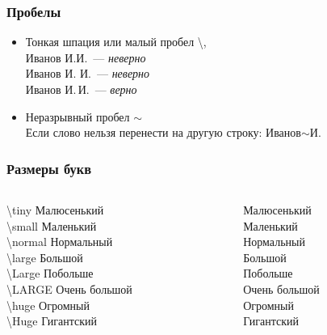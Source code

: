 \documentclass{beamer}
\begin{document}
\begin{frame}
  \frametitle{Пробелы}
  \begin{itemize}
  \item Тонкая шпация или малый пробел \textbackslash , \\
    Иванов И.И.~— {\it неверно} \\
    Иванов И. И.~— {\it неверно}\\
    Иванов И.\,И.~— {\it верно}
  \item Неразрывный пробел $\sim$\\
    Если слово нельзя перенести на другую строку: Иванов$\sim$И.
  \end{itemize}

\end{frame}

\begin{frame}
  \frametitle{Размеры букв}
  \begin{columns}
    \begin{column}{0.5\textwidth}
      \textbackslash tiny Малюсенький\\
      \textbackslash small Маленький\\
      \textbackslash normal Нормальный\\
      \textbackslash large Большой\\
      \textbackslash Large Побольше\\
      \textbackslash LARGE Очень большой\\
      \textbackslash huge Огромный\\
      \textbackslash Huge Гигантский\\
    \end{column}
    \begin{column}{0.5\textwidth}
      {\tiny Малюсенький} \\
      {\small Маленький} \\
      Нормальный \\
      {\large Большой} \\
      {\Large Побольше} \\
      {\LARGE Очень большой} \\
      {\huge Огромный} \\
      {\Huge Гигантский}
    \end{column}
  \end{columns}

\end{frame}
\end{document}
